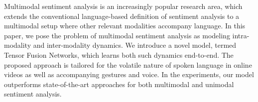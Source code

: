 Multimodal sentiment analysis is an increasingly popular research area, which extends the conventional language-based definition of sentiment analysis to a multimodal setup where other relevant modalities accompany language. In this paper, we pose the problem of multimodal sentiment analysis as modeling intra-modality and inter-modality dynamics. We introduce a novel model, termed Tensor Fusion Networks, which learns both such dynamics end-to-end. The proposed approach is tailored for the volatile nature of spoken language in online videos as well as accompanying gestures and voice. In the experiments, our model outperforms state-of-the-art approaches for both multimodal and unimodal sentiment analysis.
